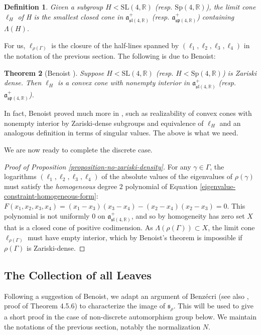 \documentclass[12pt,a4paper]{amsart}
\newcommand{\bbR}{\mathbb R}
\theoremstyle{definition}
\theoremstyle{plain}
\newtheorem{theorem}{Theorem}[section]
\newtheorem{definition}[theorem]{Definition}
\numberwithin{equation}{section}
\begin{document}
\begin{definition}
    Given a subgroup {\rm{$H < \text{SL}(4,\bbR)$}} (resp. {\rm{$\text{Sp}(4,\bbR)$}}), the {\rm{{limit cone}}} $\ell_H$ of H is the smallest closed cone in $\mathfrak{a}_{\mathfrak{sl}(4,\bbR)}^+$ (resp. $\mathfrak{a}_{\mathfrak{sp}(4,\bbR)}^+$) containing $\Lambda(H)$.
\end{definition} For us, $\ell_{\rho(\Gamma)}$ is the closure of the half-lines spanned by $(\ell_1, \ell_2, \ell_3, \ell_4)$ in the notation of the previous section. The following is due to Benoist:
\begin{theorem}[Benoist \cite{benoist1997proprietes}]\label{benoist-limit-cone-theorem}
    Suppose {\rm{$H < \text{SL}(4,\bbR)$}} (resp. {\rm{$H < \text{Sp}(4,\bbR)$}}) is Zariski dense. Then $\ell_H$ is a convex cone with nonempty interior in $\mathfrak{a}_{\mathfrak{sl}(4,\bbR)}^+$ (resp. $\mathfrak{a}_{\mathfrak{sp}(4,\bbR)}^+$).
\end{theorem}

In fact, Benoist proved much more in \cite{benoist1997proprietes}, such as realizability of convex cones with nonempty interior by Zariski-dense subgroups and equivalence of $\ell_H$ and an analogous definition in terms of singular values. The above is what we need.

We are now ready to complete the discrete case.

\begin{proof}[Proof of Proposition \ref{proposition-no-zariski-density}] For any $\gamma \in \Gamma$, the logarithms $(\ell_1, \ell_2, \ell_3, \ell_4)$ of the absolute values of the eigenvalues of $\rho(\gamma)$ must satisfy the \textit{homogeneous} degree $2$ polynomial of Equation \ref{eigenvalue-constraint-homogeneous-form}: $F(x_1,x_2,x_3,x_4) = (x_1 - x_3)(x_3 - x_4) - (x_2 - x_4)(x_2 - x_3) = 0$. This polynomial is not uniformly $0$ on $\mathfrak{a}^+_{\mathfrak{sl}(4,\bbR)}$, and so by homogeneity has zero set $X$ that is a closed cone of positive codimension. As $\Lambda(\rho(\Gamma)) \subset X$, the limit cone $\ell_{\rho(\Gamma)}$ must have empty interior, which by Benoist's theorem is impossible if $\rho(\Gamma)$ is Zariski-dense.
\end{proof}

\subsection{The Collection of all Leaves}\label{section-thanks-Yves} 
 Following a suggestion of Benoist, we adapt an argument of Benz\'ecri \cite{benzecri1960thesis} (see also \cite{goldman2022geometric}, proof of Theorem 4.5.6) to characterize the image of $\mathfrak{s}_\rho$. This will be used to give a short proof in the case of non-discrete automorphism group below. We maintain the notations of the previous section, notably the normalization $N$.
 
\end{document}
